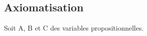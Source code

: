 \documentclass{article}
\begin{document}
\subsection{Axiomatisation}
Soit A, B et C des variables propositionnelles.
\end{document}
